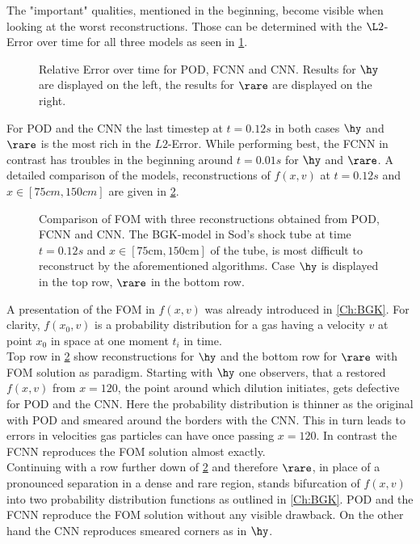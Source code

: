 The "important" qualities, mentioned in the beginning, become visible when looking at the worst reconstructions. Those can be determined with the $\L2$-Error over time for all three models as seen in \cref{Fig:ErrTime}.
\begin{figure}[htbp!]
	
	\caption{Relative Error over time for POD, FCNN and CNN. Results for $\hy$ are displayed on the left, the results for $\rare$ are displayed on the right.}
	\label{Fig:ErrTime}
\end{figure}
For POD and the CNN the last timestep at $t=0.12s$ in both cases $\hy$ and $\rare$ is the most rich in the $L2$-Error. While performing best, the FCNN in contrast has troubles in the beginning around $t=0.01s$ for $\hy$ and $\rare$. A detailed comparison of the models, reconstructions of $f(x,v)$ at $t=0.12s$ and $x \in [75cm,150cm]$ are given in \cref{Fig:ErrWorst}.
\begin{figure}[H]
	
	\caption{Comparison of FOM with three reconstructions obtained from POD, FCNN and CNN. The BGK-model in Sod's shock tube at time \(t=0.12s\) and \(x\in [75\textrm{cm}, 150\textrm{cm}]\) of the tube, is most difficult to reconstruct by the aforementioned algorithms. Case $\hy$ is displayed in the top row, $\rare$ in the bottom row. }
	\label{Fig:ErrWorst}
\end{figure}
A presentation of the FOM in $f(x,v)$ was already introduced in \cref{Ch:BGK}. For clarity, $f(x_0,v)$ is a probability distribution for a gas having a velocity $v$ at point $x_0$ in space at one moment $t_i$ in time.\\
Top row in \cref{Fig:ErrWorst} show reconstructions for $\hy$ and the bottom row for $\rare$ with FOM solution as paradigm. Starting with \(\hy\) one observers, that a restored \(f(x,v)\) from \(x=120\), the point around which dilution initiates, gets defective for POD and the CNN. Here the probability distribution is thinner as the original with POD and smeared around the borders with the CNN. This in turn leads to errors in velocities gas particles can have once passing \(x=120\). In contrast the FCNN reproduces the FOM solution almost exactly.\\
Continuing with a row further down of \cref{Fig:ErrWorst} and therefore \(\rare\), in place of a pronounced separation in a dense and rare region, stands bifurcation of \(f(x,v)\) into two probability distribution functions as outlined in \cref{Ch:BGK}. POD and the FCNN reproduce the FOM solution without any visible drawback. On the other hand the CNN reproduces smeared corners as in \(\hy\).   
